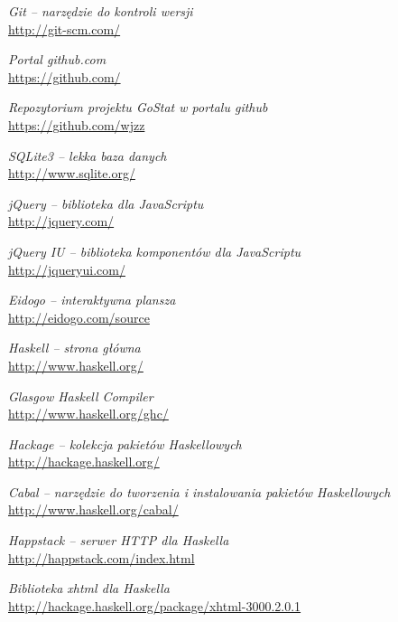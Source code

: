 \documentclass[10pt,leqno]{article}
\begin{document}
\begin{thebibliography}{9}

  \emph{Git -- narzędzie do kontroli wersji} \\
  \url{http://git-scm.com/}

  \emph{Portal github.com} \\
  \url{https://github.com/}

  \emph{Repozytorium projektu GoStat w portalu github} \\
  \url{https://github.com/wjzz}

  \emph{SQLite3 -- lekka baza danych} \\
  \url{http://www.sqlite.org/}

  \emph{jQuery -- biblioteka dla JavaScriptu} \\
  \url{http://jquery.com/}

  \emph{jQuery IU -- biblioteka komponentów dla JavaScriptu} \\
  \url{http://jqueryui.com/}

  \emph{Eidogo -- interaktywna plansza} \\
  \url{http://eidogo.com/source}

  \emph{Haskell -- strona główna} \\
  \url{http://www.haskell.org/}

  \emph{Glasgow Haskell Compiler} \\
  \url{http://www.haskell.org/ghc/}

  \emph{Hackage -- kolekcja pakietów Haskellowych} \\
  \url{http://hackage.haskell.org/}

  \emph{Cabal -- narzędzie do tworzenia i instalowania pakietów Haskellowych} \\
  \url{http://www.haskell.org/cabal/}

  \emph{Happstack -- serwer HTTP dla Haskella} \\
  \url{http://happstack.com/index.html}

  \emph{Biblioteka xhtml dla Haskella} \\
  \url{http://hackage.haskell.org/package/xhtml-3000.2.0.1}

\end{thebibliography}
\end{document}
